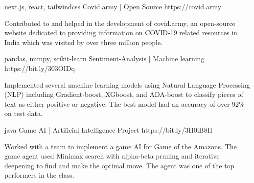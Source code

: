 \begin{cventries}

\vspace{-1.0mm}
  \cventry
    {next.js, react, tailwindcss} %
    {Covid.army | Open Source} %
    {https://covid.army} %
    {} %
    {
      \begin{cvitems} %
        \item {Contributed to and helped in the development of covid.army, an open-source website dedicated to providing information on COVID-19 related resources in India which was visited by over three million people.}  
      \end{cvitems}
    }
\vspace{-1.0mm}
  \cventry
    {pandas, numpy, scikit-learn} %
    {Sentiment-Analysis | Machine learning} %
    {https://bit.ly/303OIDq} %
    {} %
    {
      \begin{cvitems} %
        \item {Implemented several machine learning models using Natural Language Processing (NLP) including Gradient-boost, XGboost, and ADA-boost to classify pieces of text as either positive or negative. The best model had an accuracy of over 92\% on test data.} 
      \end{cvitems}
    }

\vspace{-1.0mm}
  \cventry
    {java} %
    {Game AI | Artificial Intelligence Project} %
    {https://bit.ly/3H0iB8H} %
    {} %
    {
      \begin{cvitems} %
        \item {Worked with a team to implement a game AI for Game of the Amazons. The game agent used Minimax search with alpha-beta pruning and iterative deepening to find and make the optimal move. The agent was one of the top performers in the class. }   
      \end{cvitems}
    }
\end{cventries}
